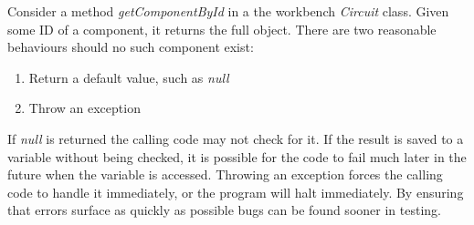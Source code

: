 Consider a method \textit{getComponentById} in a the workbench \textit{Circuit} class. Given some ID of a component, it returns the full object. There are two reasonable behaviours should no such component exist:

\begin{enumerate}
	\item Return a default value, such as \textit{null}
	\item Throw an exception
\end{enumerate}

If \textit{null} is returned the calling code may not check for it. If the result is saved to a variable without being checked, it is possible for the code to fail much later in the future when the variable is accessed. Throwing an exception forces the calling code to handle it immediately, or the program will halt immediately. By ensuring that errors surface as quickly as possible bugs can be found sooner in testing.
